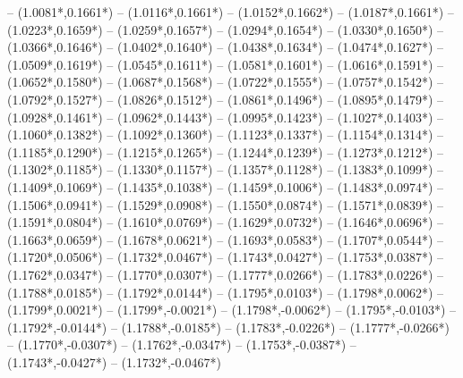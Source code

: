 {	-- ({1.0081*\dx},{0.1661*\dy})
	-- ({1.0116*\dx},{0.1661*\dy})
	-- ({1.0152*\dx},{0.1662*\dy})
	-- ({1.0187*\dx},{0.1661*\dy})
	-- ({1.0223*\dx},{0.1659*\dy})
	-- ({1.0259*\dx},{0.1657*\dy})
	-- ({1.0294*\dx},{0.1654*\dy})
	-- ({1.0330*\dx},{0.1650*\dy})
	-- ({1.0366*\dx},{0.1646*\dy})
	-- ({1.0402*\dx},{0.1640*\dy})
	-- ({1.0438*\dx},{0.1634*\dy})
	-- ({1.0474*\dx},{0.1627*\dy})
	-- ({1.0509*\dx},{0.1619*\dy})
	-- ({1.0545*\dx},{0.1611*\dy})
	-- ({1.0581*\dx},{0.1601*\dy})
	-- ({1.0616*\dx},{0.1591*\dy})
	-- ({1.0652*\dx},{0.1580*\dy})
	-- ({1.0687*\dx},{0.1568*\dy})
	-- ({1.0722*\dx},{0.1555*\dy})
	-- ({1.0757*\dx},{0.1542*\dy})
	-- ({1.0792*\dx},{0.1527*\dy})
	-- ({1.0826*\dx},{0.1512*\dy})
	-- ({1.0861*\dx},{0.1496*\dy})
	-- ({1.0895*\dx},{0.1479*\dy})
	-- ({1.0928*\dx},{0.1461*\dy})
	-- ({1.0962*\dx},{0.1443*\dy})
	-- ({1.0995*\dx},{0.1423*\dy})
	-- ({1.1027*\dx},{0.1403*\dy})
	-- ({1.1060*\dx},{0.1382*\dy})
	-- ({1.1092*\dx},{0.1360*\dy})
	-- ({1.1123*\dx},{0.1337*\dy})
	-- ({1.1154*\dx},{0.1314*\dy})
	-- ({1.1185*\dx},{0.1290*\dy})
	-- ({1.1215*\dx},{0.1265*\dy})
	-- ({1.1244*\dx},{0.1239*\dy})
	-- ({1.1273*\dx},{0.1212*\dy})
	-- ({1.1302*\dx},{0.1185*\dy})
	-- ({1.1330*\dx},{0.1157*\dy})
	-- ({1.1357*\dx},{0.1128*\dy})
	-- ({1.1383*\dx},{0.1099*\dy})
	-- ({1.1409*\dx},{0.1069*\dy})
	-- ({1.1435*\dx},{0.1038*\dy})
	-- ({1.1459*\dx},{0.1006*\dy})
	-- ({1.1483*\dx},{0.0974*\dy})
	-- ({1.1506*\dx},{0.0941*\dy})
	-- ({1.1529*\dx},{0.0908*\dy})
	-- ({1.1550*\dx},{0.0874*\dy})
	-- ({1.1571*\dx},{0.0839*\dy})
	-- ({1.1591*\dx},{0.0804*\dy})
	-- ({1.1610*\dx},{0.0769*\dy})
	-- ({1.1629*\dx},{0.0732*\dy})
	-- ({1.1646*\dx},{0.0696*\dy})
	-- ({1.1663*\dx},{0.0659*\dy})
	-- ({1.1678*\dx},{0.0621*\dy})
	-- ({1.1693*\dx},{0.0583*\dy})
	-- ({1.1707*\dx},{0.0544*\dy})
	-- ({1.1720*\dx},{0.0506*\dy})
	-- ({1.1732*\dx},{0.0467*\dy})
	-- ({1.1743*\dx},{0.0427*\dy})
	-- ({1.1753*\dx},{0.0387*\dy})
	-- ({1.1762*\dx},{0.0347*\dy})
	-- ({1.1770*\dx},{0.0307*\dy})
	-- ({1.1777*\dx},{0.0266*\dy})
	-- ({1.1783*\dx},{0.0226*\dy})
	-- ({1.1788*\dx},{0.0185*\dy})
	-- ({1.1792*\dx},{0.0144*\dy})
	-- ({1.1795*\dx},{0.0103*\dy})
	-- ({1.1798*\dx},{0.0062*\dy})
	-- ({1.1799*\dx},{0.0021*\dy})
	-- ({1.1799*\dx},{-0.0021*\dy})
	-- ({1.1798*\dx},{-0.0062*\dy})
	-- ({1.1795*\dx},{-0.0103*\dy})
	-- ({1.1792*\dx},{-0.0144*\dy})
	-- ({1.1788*\dx},{-0.0185*\dy})
	-- ({1.1783*\dx},{-0.0226*\dy})
	-- ({1.1777*\dx},{-0.0266*\dy})
	-- ({1.1770*\dx},{-0.0307*\dy})
	-- ({1.1762*\dx},{-0.0347*\dy})
	-- ({1.1753*\dx},{-0.0387*\dy})
	-- ({1.1743*\dx},{-0.0427*\dy})
	-- ({1.1732*\dx},{-0.0467*\dy})
}
